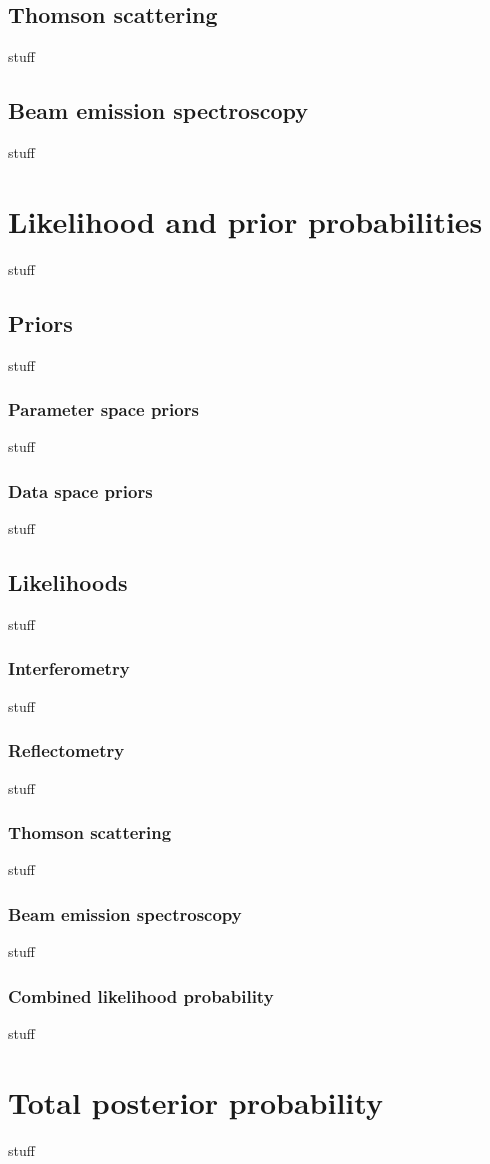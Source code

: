 \documentclass[12pt]{article}
\numberwithin{equation}{section}
\begin{document}
\subsection{Thomson scattering}
stuff
\subsection{Beam emission spectroscopy}
stuff
\section{Likelihood and prior probabilities}
stuff
\subsection{Priors}
stuff
\subsubsection{Parameter space priors}
stuff
\subsubsection{Data space priors}
stuff
\subsection{Likelihoods}
stuff
\subsubsection{Interferometry}
stuff
\subsubsection{Reflectometry}
stuff
\subsubsection{Thomson scattering}
stuff
\subsubsection{Beam emission spectroscopy}
stuff
\subsubsection{Combined likelihood probability}
stuff
\section{Total posterior probability}
stuff
\end{document}
